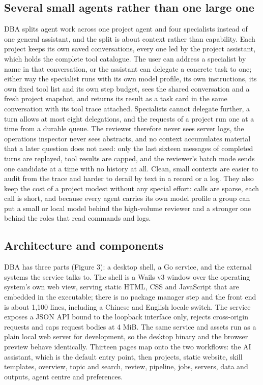 \documentclass[11pt,a4paper]{article}
\begin{document}
\subsection{Several small agents rather than one large
one}\label{several-small-agents-rather-than-one-large-one}

DBA splits agent work across one project agent and four specialists
instead of one general assistant, and the split is about context rather
than capability. Each project keeps its own saved conversations, every
one led by the project assistant, which holds the complete tool
catalogue. The user can address a specialist by name in that
conversation, or the assistant can delegate a concrete task to one;
either way the specialist runs with its own model profile, its own
instructions, its own fixed tool list and its own step budget, sees the
shared conversation and a fresh project snapshot, and returns its result
as a task card in the same conversation with its tool trace attached.
Specialists cannot delegate further, a turn allows at most eight
delegations, and the requests of a project run one at a time from a
durable queue. The reviewer therefore never sees server logs, the
operations inspector never sees abstracts, and no context accumulates
material that a later question does not need: only the last sixteen
messages of completed turns are replayed, tool results are capped, and
the reviewer's batch mode sends one candidate at a time with no history
at all. Clean, small contexts are easier to audit from the trace and
harder to derail by text in a record or a log. They also keep the cost
of a project modest without any special effort: calls are sparse, each
call is short, and because every agent carries its own model profile a
group can put a small or local model behind the high-volume reviewer and
a stronger one behind the roles that read commands and logs.

\subsection{Architecture and
components}\label{architecture-and-components}

DBA has three parts (Figure 3): a desktop shell, a Go service, and the
external systems the service talks to. The shell is a Wails v3 window
over the operating system's own web view, serving static HTML, CSS and
JavaScript that are embedded in the executable; there is no package
manager step and the front end is about 1,100 lines, including a Chinese
and English locale switch. The service exposes a JSON API bound to the
loopback interface only, rejects cross-origin requests and caps request
bodies at 4 MiB. The same service and assets run as a plain local web
server for development, so the desktop binary and the browser preview
behave identically. Thirteen pages map onto the two workflows: the AI assistant, which is
the default entry point, then projects, static website, skill
templates, overview, topic and search, review, pipeline, jobs, servers,
data and outputs, agent centre and preferences.
\end{document}
